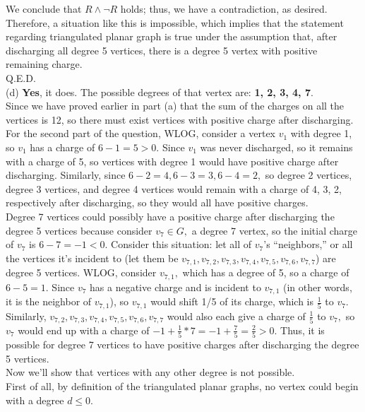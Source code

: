 \documentclass{article}
\begin{document}
\indent We conclude that $R\land\neg R$ holds; thus, we have a contradiction, as desired. Therefore, a situation like this is impossible, which implies that the statement regarding triangulated planar graph is true under the assumption that, after discharging all degree 5 vertices, there is a degree 5 vertex with positive remaining charge.\\[.1cm]
\indent Q.E.D.\\[.5cm]
(d) \textbf{Yes}, it does. The possible degrees of that vertex are: \textbf{1, 2, 3, 4, 7}.\\[.3cm]
\indent Since we have proved earlier in part (a) that the sum of the charges on all the vertices is 12, so there must exist vertices with positive charge after discharging.\\[.1cm]
\indent For the second part of the question, WLOG, consider a vertex $v_1$ with degree 1, so $v_1$ has a charge of $6 - 1 = 5 > 0.$ Since $v_1$ was never discharged, so it remains with a charge of 5, so vertices with degree 1 would have positive charge after discharging. Similarly, since $6 - 2 = 4, 6 - 3 = 3, 6 - 4 = 2,$ so degree 2 vertices, degree 3 vertices, and degree 4 vertices would remain with a charge of 4, 3, 2, respectively after discharging, so they would all have positive charges.\\[.1cm]
\indent Degree 7 vertices could possibly have a positive charge after discharging the degree 5 vertices because consider $v_7\in G,$ a degree 7 vertex, so the initial charge of $v_7$ is $6 - 7 = -1 < 0.$ Consider this situation: let all of $v_7$'s ``neighbors,'' or all the vertices it's incident to (let them be $v_{7,1}, v_{7,2}, v_{7,3}, v_{7,4}, v_{7,5}, v_{7,6}, v_{7,7}$) are degree 5 vertices. WLOG, consider $v_{7,1},$ which has a degree of 5, so a charge of $6 - 5 = 1.$ Since $v_7$ has a negative charge and is incident to $v_{7,1}$ (in other words, it is the neighbor of $v_{7,1}$), so $v_{7,1}$ would shift 1/5 of its charge, which is $\frac{1}{5}$ to $v_7.$ Similarly, $v_{7,2}, v_{7,3}, v_{7,4}, v_{7,5}, v_{7,6}, v_{7,7}$ would also each give a charge of $\frac{1}{5}$ to $v_7,$ so $v_7$ would end up with a charge of $-1 + \frac{1}{5} * 7 = -1 + \frac{7}{5} = \frac{2}{5} > 0.$ Thus, it is possible for degree 7 vertices to have positive charges after discharging the degree 5 vertices.\\[.3cm]
\indent Now we'll show that vertices with any other degree is not possible.\\[.1cm]
\indent First of all, by definition of the triangulated planar graphs, no vertex could begin with a degree $d\leq0.$\\[.1cm]
\end{document}
